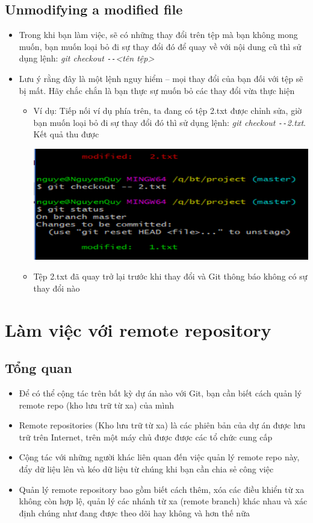 \documentclass[12pt,a4paper]{report}
\begin{document}
\subsection{Unmodifying a modified file}
\begin{itemize}
\item Trong khi bạn làm việc, sẽ có những thay đổi trên tệp mà bạn không mong muốn, bạn muốn loại bỏ đi sự thay đổi đó để quay về với nội dung cũ thì sử dụng lệnh: {\it git checkout \texttt{-{}-}<tên tệp>}\vskip 0.4cm
\item Lưu ý rằng đây là một lệnh nguy hiểm – mọi thay đổi của bạn đối với tệp sẽ bị mất. Hãy chắc chắn là bạn thực sự muốn bỏ các thay đổi vừa thực hiện
	\begin{itemize}
\item Ví dụ: Tiếp nối ví dụ phía trên, ta đang có tệp 2.txt được chỉnh sửa, giờ bạn muốn loại bỏ đi sự thay đổi đó thì sử dụng lệnh: {\it git checkout \texttt{-{}-}2.txt}. Kết quả thu được

	\includegraphics[width=0.8\linewidth]{screenshot031}

	\label{fig:screenshot031}

\item Tệp 2.txt đã quay trở lại trước khi thay đổi và Git thông báo không có sự thay đổi nào
\end{itemize}\end{itemize}

\section{Làm việc với remote repository}
\subsection{Tổng quan} 
\begin{itemize}
\item Để có thể cộng tác trên bất kỳ dự án nào với Git, bạn cần biết cách quản lý remote repo (kho lưu trữ từ xa) của mình
\item Remote repositories (Kho lưu trữ từ xa) là các phiên bản của dự án được lưu trữ trên Internet,  trên một máy chủ được được các tổ chức cung cấp
\item Cộng tác với những người khác liên quan đến việc quản lý remote repo này, đẩy dữ liệu lên và kéo dữ liệu  từ chúng khi bạn cần chia sẻ công việc
\item Quản lý remote repository bao gồm biết cách thêm, xóa các điều khiển từ xa không còn hợp lệ, quản lý các nhánh từ xa (remote branch) khác nhau và xác định chúng như đang được theo dõi hay không và hơn thế nữa
\end{itemize}
\end{document}
